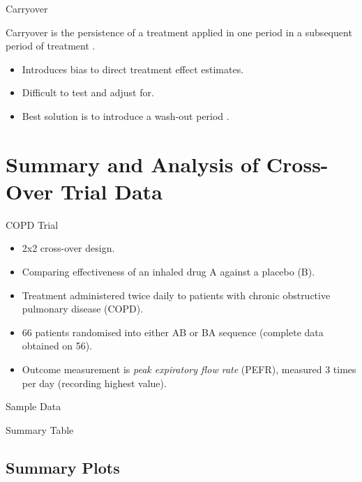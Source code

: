 \documentclass{beamer}
\begin{document}
\begin{frame}{Carryover}
    \begin{definition}
        Carryover is the persistence of a treatment applied in one period in a subsequent period of treatment \cite{senn2002crossover}.
    \end{definition}
    \begin{itemize}
        \item Introduces bias to direct treatment effect estimates.
        \item Difficult to test and adjust for.
        \item Best solution is to introduce a wash-out period \cite{senn2002crossover}.
    \end{itemize}
\end{frame}

\section{Summary and Analysis of Cross-Over Trial Data}

\begin{frame}{COPD Trial}
    \begin{itemize}
        \item 2x2 cross-over design.
        \item Comparing effectiveness of an inhaled drug A against a placebo (B).
        \item Treatment administered twice daily to patients with chronic obstructive pulmonary disease (COPD).
        \item 66 patients randomised into either AB or BA sequence (complete data obtained on 56).
        \item Outcome measurement is \textit{peak expiratory flow rate} (PEFR), measured 3 times per day (recording highest value).
    \end{itemize}
\end{frame}

\begin{frame}{Sample Data}
    
\end{frame}

\begin{frame}{Summary Table}
    
\end{frame}

\subsection{Summary Plots}
\end{document}
